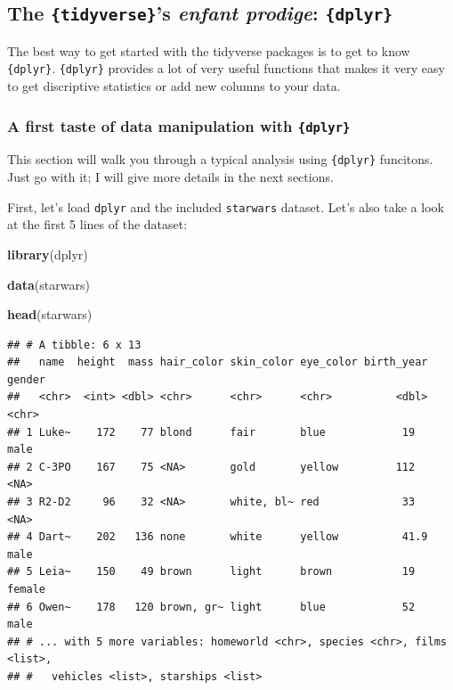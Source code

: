 \documentclass[]{gitbook}
\newenvironment{Shaded}{\begin{snugshade}}{\end{snugshade}}
\newcommand{\KeywordTok}[1]{\textcolor[rgb]{0.13,0.29,0.53}{\textbf{#1}}}
\newcommand{\NormalTok}[1]{#1}
\begin{document}
\hypertarget{the-tidyverses-enfant-prodige-dplyr}{%
\subsection{\texorpdfstring{The \texttt{\{tidyverse\}}'s \emph{enfant prodige}: \texttt{\{dplyr\}}}{The \{tidyverse\}'s enfant prodige: \{dplyr\}}}\label{the-tidyverses-enfant-prodige-dplyr}}

The best way to get started with the tidyverse packages is to get to know \texttt{\{dplyr\}}. \texttt{\{dplyr\}} provides
a lot of very useful functions that makes it very easy to get discriptive statistics or add new columns
to your data.

\hypertarget{a-first-taste-of-data-manipulation-with-dplyr}{%
\subsubsection{\texorpdfstring{A first taste of data manipulation with \texttt{\{dplyr\}}}{A first taste of data manipulation with \{dplyr\}}}\label{a-first-taste-of-data-manipulation-with-dplyr}}

This section will walk you through a typical analysis using \texttt{\{dplyr\}} funcitons. Just go with it; I
will give more details in the next sections.

First, let's load \texttt{dplyr} and the included \texttt{starwars} dataset. Let's also take a look at the first 5
lines of the dataset:

\begin{Shaded}
\begin{Highlighting}[]
\KeywordTok{library}\NormalTok{(dplyr)}

\KeywordTok{data}\NormalTok{(starwars)}

\KeywordTok{head}\NormalTok{(starwars)}
\end{Highlighting}
\end{Shaded}

\begin{verbatim}
## # A tibble: 6 x 13
##   name  height  mass hair_color skin_color eye_color birth_year gender
##   <chr>  <int> <dbl> <chr>      <chr>      <chr>          <dbl> <chr> 
## 1 Luke~    172    77 blond      fair       blue            19   male  
## 2 C-3PO    167    75 <NA>       gold       yellow         112   <NA>  
## 3 R2-D2     96    32 <NA>       white, bl~ red             33   <NA>  
## 4 Dart~    202   136 none       white      yellow          41.9 male  
## 5 Leia~    150    49 brown      light      brown           19   female
## 6 Owen~    178   120 brown, gr~ light      blue            52   male  
## # ... with 5 more variables: homeworld <chr>, species <chr>, films <list>,
## #   vehicles <list>, starships <list>
\end{verbatim}
\end{document}
